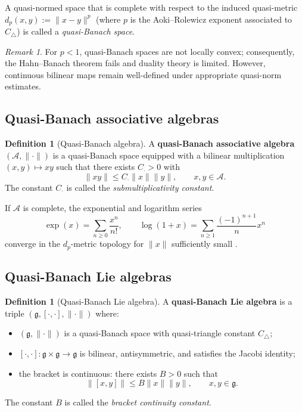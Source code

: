 \documentclass[10pt]{amsart}
\theoremstyle{definition}
\newtheorem{definition}[theorem]{Definition}
\theoremstyle{remark}
\newtheorem{remark}[theorem]{Remark}
\numberwithin{equation}{section}
\newcommand{\Ctri}{C_{\triangle}}    %
\newcommand{\Cmult}{C_{\cdot}}       %
\newcommand{\Cbracket}{B}            %
\newcommand{\dpmet}[2]{d_p(#1,#2)}   %
\begin{document}
A quasi-normed space that is complete with respect to the induced quasi-metric
$\dpmet{x}{y}:=\|x-y\|^p$ (where $p$ is the Aoki--Rolewicz exponent associated to
$\Ctri$) is called a \emph{quasi-Banach space}.

\begin{remark}
For $p<1$, quasi-Banach spaces are not locally convex; consequently, the Hahn--Banach
theorem fails and duality theory is limited.  However, continuous bilinear maps remain
well-defined under appropriate quasi-norm estimates.
\end{remark}

\subsection{Quasi-Banach associative algebras}

\begin{definition}[Quasi-Banach algebra]\label{def:quasialgebra}
A \textbf{quasi-Banach associative algebra} $(\mathcal{A},\|\cdot\|)$ is a quasi-Banach
space equipped with a bilinear multiplication $(x,y)\mapsto xy$ such that there exists
$\Cmult>0$ with
\[
  \|xy\|\le \Cmult\|x\|\|y\|, \qquad x,y\in\mathcal{A}.
\]
The constant $\Cmult$ is called the \emph{submultiplicativity constant}.
\end{definition}

If $\mathcal{A}$ is complete, the exponential and logarithm series
\[
  \exp(x)=\sum_{n\ge 0}\frac{x^n}{n!}, \qquad
  \log(1+x)=\sum_{n\ge 1}\frac{(-1)^{n+1}}{n}x^n
\]
converge in the $d_p$-metric topology for $\|x\|$ sufficiently small \cite{Kalton2003}.

\subsection{Quasi-Banach Lie algebras}

\begin{definition}[Quasi-Banach Lie algebra]\label{def:quasiLie}
A \textbf{quasi-Banach Lie algebra} is a triple $(\mathfrak{g},[\cdot,\cdot],\|\cdot\|)$
where:
\begin{itemize}
    \item $(\mathfrak{g},\|\cdot\|)$ is a quasi-Banach space with quasi-triangle constant
          $\Ctri$;
    \item $[\cdot,\cdot]:\mathfrak{g}\times\mathfrak{g}\to\mathfrak{g}$ is bilinear,
          antisymmetric, and satisfies the Jacobi identity;
    \item the bracket is continuous: there exists $\Cbracket>0$ such that
          \[
            \|[x,y]\|\le \Cbracket\|x\|\|y\|, \qquad x,y\in\mathfrak{g}.
          \]
\end{itemize}
The constant $\Cbracket$ is called the \emph{bracket continuity constant}.
\end{definition}
\end{document}

